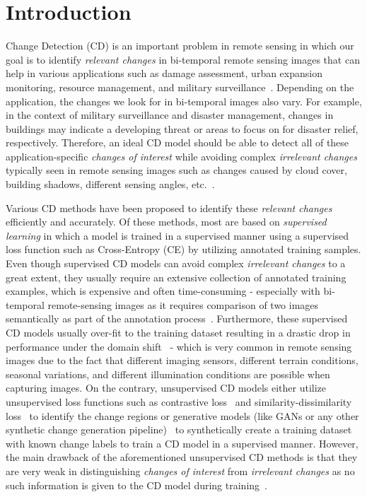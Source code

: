 \documentclass[runningheads]{llncs}
\begin{document}
\section{Introduction}
Change Detection (CD) is an important problem in remote sensing in which our goal is to identify \textit{relevant changes} in bi-temporal remote sensing images that can help in various applications such as damage assessment, urban expansion monitoring, resource management, and military surveillance~\cite{caye2019guided,changeformer,daudt2018fully}. Depending on the application, the changes we look for in bi-temporal images also vary. For example, in the context of military surveillance and disaster management, changes in buildings may indicate a developing threat or areas to focus on for disaster relief, respectively. Therefore, an ideal CD model should be able to detect all of these application-specific \textit{changes of interest} while avoiding  complex \textit{irrelevant changes} typically seen in remote sensing images such as changes caused by cloud cover, building shadows, different sensing angles, etc.~\cite{cd_survey}.

Various CD methods have been proposed to identify these \textit{relevant changes} efficiently and accurately. Of these methods, most are based on \textit{supervised learning} in which a model is trained in a supervised manner using a supervised loss function such as Cross-Entropy (CE) by utilizing annotated training samples. Even though supervised CD models can avoid complex \textit{irrelevant changes} to a great extent, they usually require an extensive collection of annotated training examples, which is expensive and often time-consuming - especially with bi-temporal remote-sensing images as it requires comparison of two images semantically as part of the annotation process~\cite{shen2021s2looking}. Furthermore, these supervised CD models usually over-fit to the training dataset resulting in a drastic drop in performance under the domain shift~\cite{wang2021loveda} - which is very common in remote sensing images due to the fact that different imaging sensors, different terrain conditions, seasonal variations, and different illumination conditions are possible when capturing images. On the contrary, unsupervised CD models either utilize unsupervised loss functions such as contrastive loss~\cite{contrastive_cd} and similarity-dissimilarity loss~\cite{bruzzone2000automatic,semi_metric_learning,celik2009unsupervised,melgani2002unsupervised,semi_SVM} to identify the change regions or generative models (like GANs or any other synthetic change generation pipeline)~\cite{unsup_gan} to synthetically create a training dataset with known change labels to train a CD model in a supervised manner. However, the main drawback of the aforementioned unsupervised CD methods is that they are very weak in distinguishing \textit{changes of interest} from \textit{irrelevant changes} as no such information is given to the CD model during training~\cite{bovolo2006theoretical}. 
\end{document}
